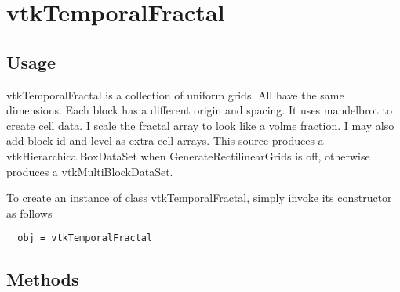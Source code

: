 \section{vtkTemporalFractal}

\subsection{Usage}

 vtkTemporalFractal is a collection of uniform grids.  All have the same
 dimensions. Each block has a different origin and spacing.  It uses
 mandelbrot to create cell data. I scale the fractal array to look like a
 volme fraction.
 I may also add block id and level as extra cell arrays.
 This source produces a vtkHierarchicalBoxDataSet when 
 GenerateRectilinearGrids is off, otherwise produces a vtkMultiBlockDataSet.

To create an instance of class vtkTemporalFractal, simply
invoke its constructor as follows
\begin{verbatim}
  obj = vtkTemporalFractal
\end{verbatim}
\subsection{Methods}

